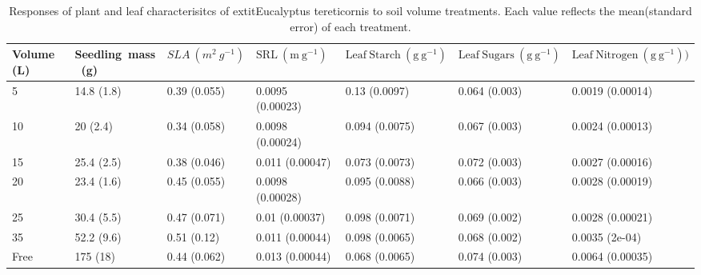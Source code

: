 \documentclass[a4paper]{article}\usepackage[]{graphicx}\usepackage[]{color}
\begin{document}
\begin{table}
\centering
\caption{Responses of plant and leaf characterisitcs of 	extit{Eucalyptus tereticornis} to soil volume treatments. Each value reflects the mean(standard error) of each treatment.} 
\label{table:Table1}
\begin{tabular}{lllllll}
  \hline
Volume (L) & 	{Seedling~mass~(g)} & $SLA~(m^2~g^{-1})$ & $\mathrm{SRL~(m~g^{-1})}$ & $\mathrm{Leaf~Starch~(g~g^{-1})}$ & $\mathrm{Leaf~Sugars~(g~g^{-1})}$ & $\mathrm{Leaf~Nitrogen~(g~g^{-1}))}$ \\ 
  \hline
5 & 14.8 (1.8) & 0.39 (0.055) & 0.0095 (0.00023) & 0.13 (0.0097) & 0.064 (0.003) & 0.0019 (0.00014) \\ 
  10 & 20 (2.4) & 0.34 (0.058) & 0.0098 (0.00024) & 0.094 (0.0075) & 0.067 (0.003) & 0.0024 (0.00013) \\ 
  15 & 25.4 (2.5) & 0.38 (0.046) & 0.011 (0.00047) & 0.073 (0.0073) & 0.072 (0.003) & 0.0027 (0.00016) \\ 
  20 & 23.4 (1.6) & 0.45 (0.055) & 0.0098 (0.00028) & 0.095 (0.0088) & 0.066 (0.003) & 0.0028 (0.00019) \\ 
  25 & 30.4 (5.5) & 0.47 (0.071) & 0.01 (0.00037) & 0.098 (0.0071) & 0.069 (0.002) & 0.0028 (0.00021) \\ 
  35 & 52.2 (9.6) & 0.51 (0.12) & 0.011 (0.00044) & 0.098 (0.0065) & 0.068 (0.002) & 0.0035 (2e-04) \\ 
  Free & 175 (18) & 0.44 (0.062) & 0.013 (0.00044) & 0.068 (0.0065) & 0.074 (0.003) & 0.0064 (0.00035) \\ 
   \hline
\end{tabular}
\end{table}
\end{document}
